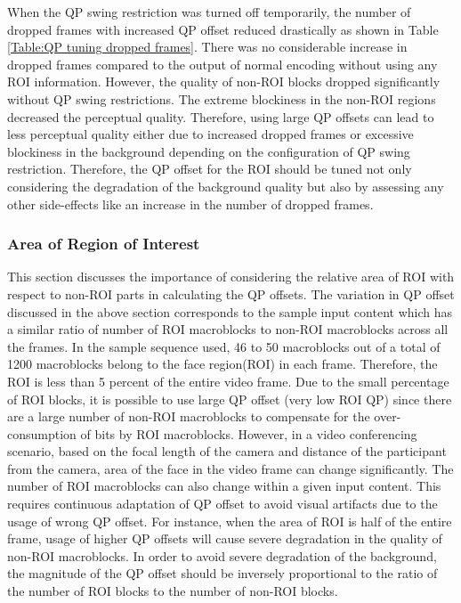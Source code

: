 \documentclass[11pt]{article} %
\begin{document}
When the QP swing restriction was turned off temporarily, the number of dropped frames with increased QP offset reduced drastically as shown in Table \ref{Table:QP tuning dropped frames}. There was no considerable increase in dropped frames compared to the output of normal encoding without using any ROI information. However, the quality of non-ROI blocks dropped significantly without QP swing restrictions. The extreme blockiness in the non-ROI regions decreased the perceptual quality. Therefore, using large QP offsets can lead to less perceptual quality either due to increased dropped frames or excessive blockiness in the background depending on the configuration of QP swing restriction. Therefore, the QP offset for the ROI should be tuned not only considering the degradation of the background quality but also by assessing any other side-effects like an increase in the number of dropped frames.

%
\subsubsection{Area of Region of Interest}
This section discusses the importance of considering the relative area of ROI with respect to non-ROI parts in calculating the QP offsets. The variation in QP offset discussed in the above section corresponds to the sample input content which has a similar ratio of number of ROI macroblocks to non-ROI macroblocks across all the frames. In the sample sequence used, 46 to 50 macroblocks out of a total of 1200 macroblocks belong to the face region(ROI) in each frame. Therefore, the ROI is less than 5 percent of the entire video frame. Due to the small percentage of ROI blocks, it is possible to use large QP offset (very low ROI QP) since there are a large number of non-ROI macroblocks to compensate for the over-consumption of bits by ROI macroblocks. However, in a video conferencing scenario,  based on the focal length of the camera and distance of the participant from the camera, area of the face in the video frame can change significantly. The number of ROI macroblocks can also change within a given input content. This requires continuous adaptation of QP offset to avoid visual artifacts due to the usage of wrong QP offset. For instance, when the area of ROI is half of the entire frame, usage of higher QP offsets will cause severe degradation in the quality of non-ROI macroblocks. In order to avoid severe degradation of the background, the magnitude of the QP offset should be inversely proportional to the ratio of the number of ROI blocks to the number of non-ROI blocks.
\end{document}
